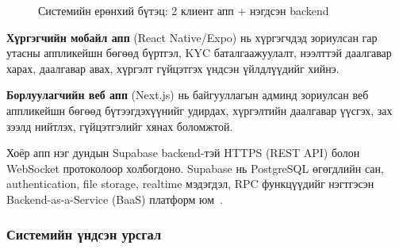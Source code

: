 \begin{figure}[H]
{
}
\caption{Системийн ерөнхий бүтэц: 2 клиент апп + нэгдсэн backend}
\label{fig:system_overview}
\end{figure}

\textbf{Хүргэгчийн мобайл апп} (React Native/Expo) нь хүргэгчдэд зориулсан гар утасны аппликейшн бөгөөд бүртгэл, KYC баталгаажуулалт, нээлттэй даалгавар харах, даалгавар авах, хүргэлт гүйцэтгэх үндсэн үйлдлүүдийг хийнэ.

\textbf{Борлуулагчийн веб апп} (Next.js) нь байгууллагын админд зориулсан веб аппликейшн бөгөөд бүтээгдэхүүнийг удирдах, хүргэлтийн даалгавар үүсгэх, зах зээлд нийтлэх, гүйцэтгэлийг хянах боломжтой.

Хоёр апп нэг дундын Supabase backend-тэй HTTPS (REST API) болон WebSocket протоколоор холбогдоно. Supabase нь PostgreSQL өгөгдлийн сан, authentication, file storage, realtime мэдэгдэл, RPC функцүүдийг нэгтгэсэн Backend-as-a-Service (BaaS) платформ юм~\cite{baldini2017serverless, adzic2017serverless}.

\subsubsection{Системийн үндсэн урсгал}

